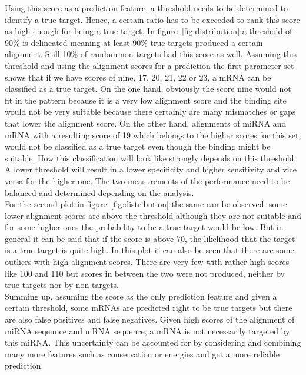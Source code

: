 \documentclass[11pt, a4paper, twoside]{book}
\begin{document}
Using this score as a prediction feature, a threshold needs to be determined to identify a true target. Hence, a certain ratio has to be exceeded to rank this score as high enough for being a true target. In figure~\ref{fig:distribution} a threshold of 90\% is delineated meaning at least 90\% true targets produced a certain alignment. Still 10\% of random non-targets had this score as well. Assuming this threshold and using the alignment scores for a prediction the first parameter set shows that if we have scores of nine, 17, 20, 21, 22 or 23, a mRNA can be classified as a true target. On the one hand, obviously the score nine would not fit in the pattern because it is a very low alignment score and the binding site would not be very suitable because there certainly are many mismatches or gaps that lower the alignment score. On the other hand, alignments of miRNA and mRNA with a resulting score of 19 which belongs to the higher scores for this set, would not be classified as a true target even though the binding might be suitable. How this classification will look like strongly depends on this threshold. A lower threshold will result in a lower specificity and higher sensitivity and vice versa for the higher one. The two measurements of the performance need to be balanced and determined depending on the analysis. \\

For the second plot in figure~\ref{fig:distribution} the same can be observed: some lower alignment scores are above the threshold although they are not suitable and for some higher ones the probability to be a true target would be low. But in general it can be said that if the score is above 70, the likelihood that the target is a true target is quite high. In this plot it can also be seen that there are some outliers with high alignment scores. There are very few with rather high scores like 100 and 110 but scores in between the two were not produced, neither by true targets nor by non-targets.  \\

Summing up, assuming the score as the only prediction feature and given a certain threshold, some mRNAs are predicted right to be true targets but there are also false positives and false negatives. Given high scores of the alignment of miRNA seqeunce and mRNA sequence, a mRNA is not necessarily targeted by this miRNA. This uncertainty can be accounted for by considering and combining many more features such as conservation or energies and get a more reliable prediction.\\
\end{document}

